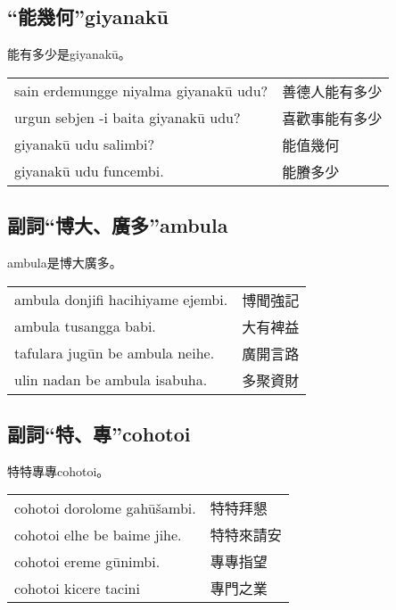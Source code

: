 \documentclass{article}
\begin{document}
\subsection{“能幾何”giyanak\={u}}
\noindent 能有多少是giyanak\={u}。
\begin{center}
    \begin{tabularx}{\textwidth}{XX}
        sain erdemungge niyalma giyanak\={u} udu? & 善德人能有多少\\
        urgun sebjen -i baita giyanak\={u} udu? &喜歡事能有多少\\
        giyanak\={u} udu salimbi? &能值幾何\\
        giyanak\={u} udu funcembi. &能賸多少
    \end{tabularx}
\end{center}

\subsection{副詞“博大、廣多”ambula}
\noindent ambula是博大廣多。
\begin{center}
    \begin{tabularx}{\textwidth}{XX}
        ambula donjifi hacihiyame ejembi. & 博聞強記\\
        ambula tusangga babi. & 大有裨益\\
        tafulara jug\={u}n be ambula neihe. & 廣開言路\\
        ulin nadan be ambula isabuha. & 多聚資財
    \end{tabularx}
\end{center}

\subsection{副詞“特、專”cohotoi}
\noindent 特特專專cohotoi。
\begin{center}
    \begin{tabularx}{\textwidth}{XX}
        cohotoi dorolome gah\={u}\v{s}ambi. & 特特拜懇\\
        cohotoi elhe be baime jihe. & 特特來請安\\
        cohotoi ereme g\={u}nimbi. & 專專指望\\
        cohotoi kicere tacini & 專門之業
    \end{tabularx}
\end{center}
\end{document}
